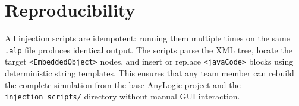 \section{Reproducibility}

All injection scripts are idempotent: running them multiple times on the same \texttt{.alp} file produces identical output. The scripts parse the XML tree, locate the target \texttt{<EmbeddedObject>} nodes, and insert or replace \texttt{<javaCode>} blocks using deterministic string templates. This ensures that any team member can rebuild the complete simulation from the base AnyLogic project and the \texttt{injection\_scripts/} directory without manual GUI interaction.

